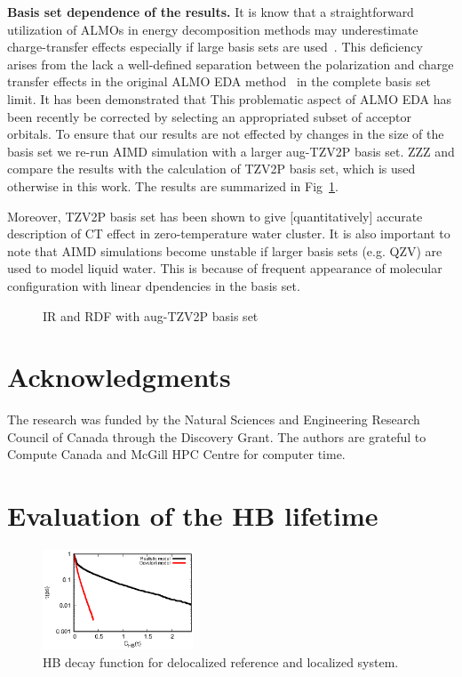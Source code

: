 \documentclass[aps,prl,reprint,amsmath,amssymb]{revtex4-1}
\begin{document}
\textbf{Basis set dependence of the results.} 
%
It is know that a straightforward utilization of ALMOs in energy decomposition methods may underestimate charge-transfer effects especially if large basis sets are used~\cite{horn2015polarization,herbert2016}. 
This deficiency arises from the lack a well-defined separation between the polarization and charge transfer effects in the original ALMO EDA method~\cite{khaliullin2007unravelling} in the complete basis set limit. 
It has been demonstrated that This problematic aspect of ALMO EDA has been recently be corrected by selecting an appropriated subset of acceptor orbitals\cite{horn2015polarization}. 
To ensure that our results are not effected by changes in the size of the basis set we re-run AIMD simulation with a larger aug-TZV2P basis set. 
ZZZ and compare the results with the calculation of TZV2P basis set, which is used otherwise in this work. 
The results are summarized in Fig~\ref{Fig:basis}.

Moreover, TZV2P basis set has been shown to give [quantitatively] accurate description of CT effect in zero-temperature water cluster. 
It is also important to note that AIMD simulations become unstable if larger basis sets (e.g. QZV) are used to model liquid water. 
This is because of frequent appearance of molecular configuration with linear dpendencies in the basis set.

\begin{figure}
\caption{IR and RDF with aug-TZV2P basis set}\label{Fig:basis}
\end{figure} 


\section{Acknowledgments} 

The research was funded by the Natural Sciences and Engineering Research Council of Canada through the Discovery Grant. 
The authors are grateful to Compute Canada and McGill HPC Centre for computer time.



\else %


\section{Evaluation of the HB lifetime} 

\begin{figure}
\includegraphics[width=0.4\textwidth]{new_hbdecay}
\caption{HB decay function for delocalized reference and localized system.} \label{Fig:HBdecay}
\end{figure}
\end{document}
